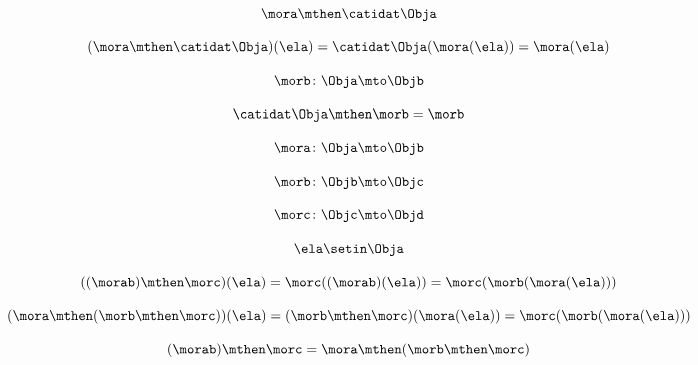 \begin{forslides}
    \begin{equation}
        \label{eq:semicats-slides-91}
        \mora \mthen \catidat\Obja
    \end{equation}

    \begin{equation}
        \label{eq:semicats-slides-92}
        (\mora \mthen \catidat\Obja)(\ela)
        = \catidat\Obja(\mora (\ela)) = \mora (\ela)
    \end{equation}

    \begin{equation}
        \label{eq:semicats-slides-93}
        \morb \colon \Obja \mto \Objb
    \end{equation}

    \begin{equation}
        \label{eq:semicats-slides-94}
        \catidat\Obja \mthen \morb = \morb
    \end{equation}

    \begin{equation}
        \label{eq:semicats-slides-95}
        \mora \colon \Obja \mto \Objb
    \end{equation}

    \begin{equation}
        \label{eq:semicats-slides-96}
        \morb\colon \Objb \mto \Objc
    \end{equation}

    \begin{equation}
        \label{eq:semicats-slides-97}
        \morc \colon \Objc \mto \Objd
    \end{equation}

    \begin{equation}
        \label{eq:semicats-slides-98}
        \ela \setin \Obja
    \end{equation}

    \begin{equation}
        \label{eq:semicats-slides-99}
        ((\morab) \mthen \morc)(\ela) =  \morc((\morab)(\ela)) = \morc (\morb (\mora (\ela)))
    \end{equation}

    \begin{equation}
        \label{eq:semicats-slides-99b}
        (\mora \mthen (\morb \mthen \morc))(\ela)
        =  (\morb \mthen \morc)(\mora(\ela)) = \morc (\morb (\mora (\ela)))
    \end{equation}

    \begin{equation}
        \label{eq:semicats-slides-100}
        (\morab)
        \mthen \morc = \mora \mthen (\morb \mthen \morc)
    \end{equation}


\end{forslides}
